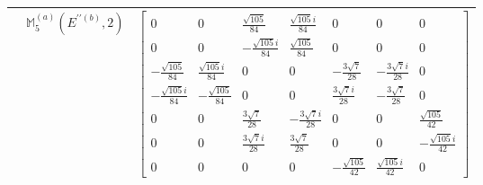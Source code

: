 \documentclass[fleqn,8pt,landscape]{jsarticle}
\begin{document}
\begin{longtable}{ccc}
$  $ & $ \mathbb{M}_{5}^{(a)}(E^{\prime\prime(b)},2) $ & $ \begin{bmatrix} 0 & 0 & \frac{\sqrt{105}}{84} & \frac{\sqrt{105} i}{84} & 0 & 0 & 0 \\ 0 & 0 & - \frac{\sqrt{105} i}{84} & \frac{\sqrt{105}}{84} & 0 & 0 & 0 \\ - \frac{\sqrt{105}}{84} & \frac{\sqrt{105} i}{84} & 0 & 0 & - \frac{3 \sqrt{7}}{28} & - \frac{3 \sqrt{7} i}{28} & 0 \\ - \frac{\sqrt{105} i}{84} & - \frac{\sqrt{105}}{84} & 0 & 0 & \frac{3 \sqrt{7} i}{28} & - \frac{3 \sqrt{7}}{28} & 0 \\ 0 & 0 & \frac{3 \sqrt{7}}{28} & - \frac{3 \sqrt{7} i}{28} & 0 & 0 & \frac{\sqrt{105}}{42} \\ 0 & 0 & \frac{3 \sqrt{7} i}{28} & \frac{3 \sqrt{7}}{28} & 0 & 0 & - \frac{\sqrt{105} i}{42} \\ 0 & 0 & 0 & 0 & - \frac{\sqrt{105}}{42} & \frac{\sqrt{105} i}{42} & 0 \end{bmatrix} $ \\ \hline
\end{longtable}
\end{document}
